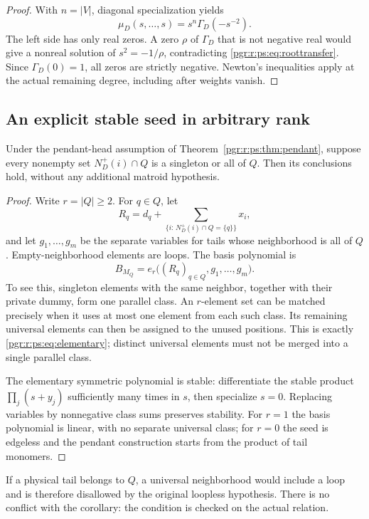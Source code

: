 \documentclass[11pt]{article}
\numberwithin{equation}{section}
\theoremstyle{definition}\newtheorem{definition}[theorem]{Definition}\newtheorem{remark}[theorem]{Remark}
\newcommand{\Ga}{\Gamma}                   %
\begin{document}
\begin{proof}
With $n=|V|$, diagonal specialization yields
\begin{equation}\label{pgr:r:ps:eq:roottransfer}
 \mu_D(s,\ldots,s)=s^n\Ga_D(-s^{-2}).
\end{equation}
The left side has only real zeros. A zero $\rho$ of $\Ga_D$ that is not negative real would give a nonreal solution of $s^2=-1/\rho$, contradicting \eqref{pgr:r:ps:eq:roottransfer}. Since $\Ga_D(0)=1$, all zeros are strictly negative. Newton's inequalities apply at the actual remaining degree, including after weights vanish.
\end{proof}

\subsection{An explicit stable seed in arbitrary rank}
\begin{corollary}\label{pgr:r:ps:cor:elementary}
Under the pendant-head assumption of Theorem~\ref{pgr:r:ps:thm:pendant}, suppose every nonempty set $N_D^+(i)\cap Q$ is a singleton or all of $Q$. Then its conclusions hold, without any additional matroid hypothesis.
\end{corollary}
\begin{proof}
Write $r=|Q|\ge2$. For $q\in Q$, let
\[
 R_q=d_q+\sum_{\{i:\,N_D^+(i)\cap Q=\{q\}\}}x_i,
\]
and let $g_1,\ldots,g_m$ be the separate variables for tails whose neighborhood is all of $Q$. Empty-neighborhood elements are loops. The basis polynomial is
\begin{equation}\label{pgr:r:ps:eq:elementary}
 B_{M_Q}=e_r\bigl((R_q)_{q\in Q},g_1,\ldots,g_m\bigr).
\end{equation}
To see this, singleton elements with the same neighbor, together with their private dummy, form one parallel class. An $r$-element set can be matched precisely when it uses at most one element from each such class. Its remaining universal elements can then be assigned to the unused positions. This is exactly \eqref{pgr:r:ps:eq:elementary}; distinct universal elements must not be merged into a single parallel class.

The elementary symmetric polynomial is stable: differentiate the stable product $\prod_j(s+y_j)$ sufficiently many times in $s$, then specialize $s=0$. Replacing variables by nonnegative class sums preserves stability. For $r=1$ the basis polynomial is linear, with no separate universal class; for $r=0$ the seed is edgeless and the pendant construction starts from the product of tail monomers.
\end{proof}
If a physical tail belongs to $Q$, a universal neighborhood would include a loop and is therefore disallowed by the original loopless hypothesis. There is no conflict with the corollary: the condition is checked on the actual relation.
\end{document}
